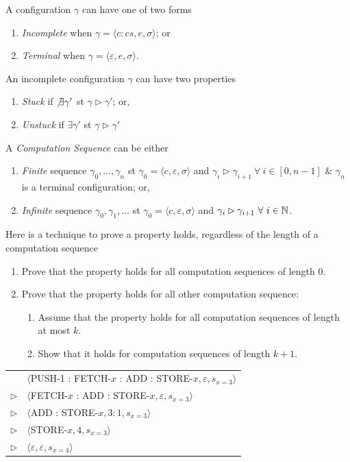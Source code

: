 \documentclass[11pt,a4paper]{article}
\begin{document}
A configuration $\gamma$ can have one of two forms
\begin{enumerate}[label=\roman*)]
	\item \textit{Incomplete} when $\gamma=\langle c:cs,e,\sigma\rangle$; or
	\item \textit{Terminal} when $\gamma=\langle \varepsilon,e,\sigma\rangle$.
\end{enumerate}

An incomplete configuration $\gamma$ can have two properties
\begin{enumerate}[label=\roman*)]
	\item \textit{Stuck} if $\not\exists\gamma'$ st $\gamma\rhd\gamma'$; or,
	\item \textit{Unstuck} if $\exists\gamma'$ st $\gamma\rhd\gamma'$
\end{enumerate}

A \textit{Computation Sequence} can be either
\begin{enumerate}[label=\roman*)]
	\item \textit{Finite} sequence $\gamma_0,\dots,\gamma_n$ st $\gamma_0=\langle c,\varepsilon,\sigma\rangle$ and $\gamma_i\rhd\gamma_{i+1}\ \forall\ i\in[0,n-1]$ \& $\gamma_n$ is a terminal configuration; or,
	\item \textit{Infinite} sequence $\gamma_0,\gamma_1,\dots$ st $\gamma_0=\langle c,\varepsilon,\sigma\rangle$ and $\gamma_i\rhd\gamma_{i+1}\ \forall\ i\in\nats$.
\end{enumerate}

Here is a technique to prove a property holds, regardless of the length of a computation sequence
\begin{enumerate}[label=\roman*)]
	\item Prove that the property holds for all computation sequences of length 0.
	\item Prove that the property holds for all other computation sequence:
	\begin{enumerate}
		\item Assume that the property holds for all computation sequences of length at most $k$.
		\item Show that it holds for computation sequences of length $k+1$.
	\end{enumerate}
\end{enumerate}

\begin{tabular}{rl}
&$\langle$PUSH-1 : FETCH-$x$ : ADD : STORE-$x,\varepsilon,s_{x=3}\rangle$\\
$\rhd$&$\langle$FETCH-$x$ : ADD : STORE-$x,\varepsilon,s_{x=3}\rangle$\\
$\rhd$&$\langle$ADD : STORE-$x,3:1,s_{x=3}\rangle$\\
$\rhd$&$\langle$STORE-$x,4,s_{x=3}\rangle$\\
$\rhd$&$\langle\varepsilon,\varepsilon,s_{x=4}\rangle$
\end{tabular}
\\
\end{document}
